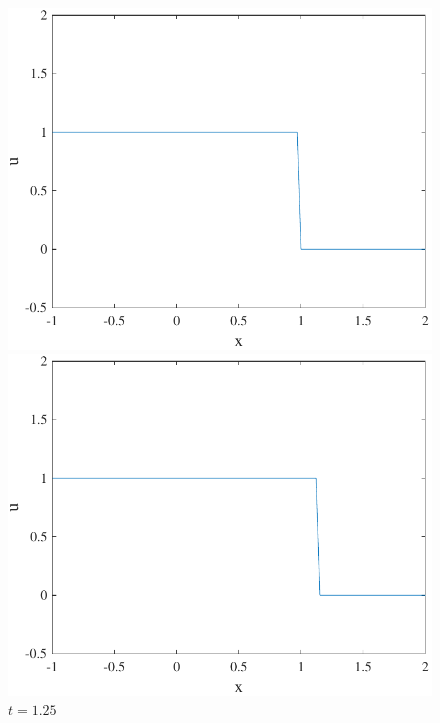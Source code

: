 \documentclass{article}
\begin{document}
\begin{figure}[H]
\begin{minipage}[b]{0.49\textwidth}
  \end{minipage}
      \hfill
  \begin{minipage}[b]{0.49\textwidth}
    \includegraphics[width=\textwidth]{hw_14_plot9.pdf}
    \caption{$t = 1$}

  \end{minipage}
      \hfill
  \begin{minipage}[b]{0.49\textwidth}
    \includegraphics[width=\textwidth]{hw_14_plot10.pdf}
    \caption{$t = 1.25$}


\end{minipage}
\end{figure}
\end{document}
